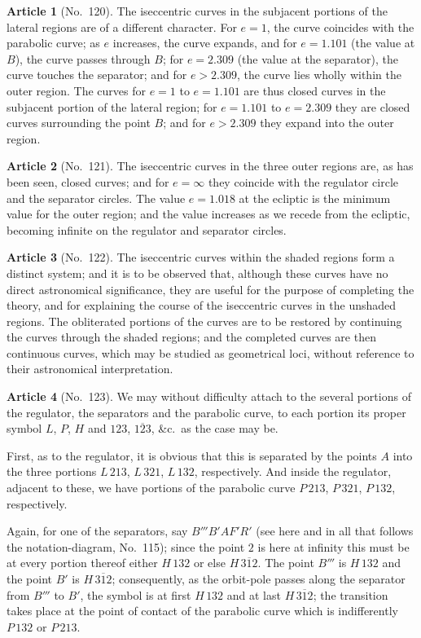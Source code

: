 \documentclass[11pt,a4paper]{article}
\theoremstyle{definition}
\newtheorem{art}{Article}
\begin{document}
\begin{art}[No.~120]
The iseccentric curves in the subjacent portions of the lateral regions are of a different character. For $e = 1$, the curve coincides with the parabolic curve; as $e$ increases, the curve expands, and for $e = 1.101$ (the value at $B$), the curve passes through $B$; for $e = 2.309$ (the value at the separator), the curve touches the separator; and for $e > 2.309$, the curve lies wholly within the outer region. The curves for $e = 1$ to $e = 1.101$ are thus closed curves in the subjacent portion of the lateral region; for $e = 1.101$ to $e = 2.309$ they are closed curves surrounding the point $B$; and for $e > 2.309$ they expand into the outer region.
\end{art}

\begin{art}[No.~121]
The iseccentric curves in the three outer regions are, as has been seen, closed curves; and for $e = \infty$ they coincide with the regulator circle and the separator circles. The value $e = 1.018$ at the ecliptic is the minimum value for the outer region; and the value increases as we recede from the ecliptic, becoming infinite on the regulator and separator circles.
\end{art}

\begin{art}[No.~122]
The iseccentric curves within the shaded regions form a distinct system; and it is to be observed that, although these curves have no direct astronomical significance, they are useful for the purpose of completing the theory, and for explaining the course of the iseccentric curves in the unshaded regions. The obliterated portions of the curves are to be restored by continuing the curves through the shaded regions; and the completed curves are then continuous curves, which may be studied as geometrical loci, without reference to their astronomical interpretation.
\end{art}

\begin{art}[No.~123]
We may without difficulty attach to the several portions of the regulator, the separators and the parabolic curve, to each portion its proper symbol $L$, $P$, $H$ and $123$, $\overline{123}$, \&c.\ as the case may be.

First, as to the regulator, it is obvious that this is separated by the points $A$ into the three portions $L\,213$, $L\,321$, $L\,132$, respectively. And inside the regulator, adjacent to these, we have portions of the parabolic curve $P\,213$, $P\,321$, $P\,132$, respectively.

Again, for one of the separators, say $B'''B'AF'R'$ (see here and in all that follows the notation-diagram, No.~115); since the point $2$ is here at infinity this must be at every portion thereof either $H\,132$ or else $H\,\overline{312}$. The point $B'''$ is $H\,132$ and the point $B'$ is $H\,\overline{312}$; consequently, as the orbit-pole passes along the separator from $B'''$ to $B'$, the symbol is at first $H\,132$ and at last $H\,\overline{312}$; the transition takes place at the point of contact of the parabolic curve which is indifferently $P\,132$ or $P\,213$.
\end{art}
\end{document}
